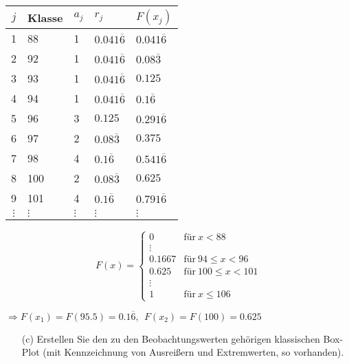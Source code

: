 
\begin{table}[H]
\centering
\begin{tabular}{c|llll}
     $j$      & Klasse   & $a_j$     & $r_j$               & $F(x_j)$ \\ \hline
     1        & 88       & 1         & $0.041\overline{6}$ & $0.041\overline{6}$ \\
     2        & 92       & 1         & $0.041\overline{6}$ & $0.08\overline{3}$  \\
     3        & 93       & 1         & $0.041\overline{6}$ & $0.125$             \\
     4        & 94       & 1         & $0.041\overline{6}$ & $0.1\overline{6}$   \\
     5        & 96       & 3         & $0.125$             & $0.291\overline{6}$ \\
     6        & 97       & 2         & $0.08\overline{3}$  & $0.375$             \\
     7        & 98       & 4         & $0.1\overline{6}$   & $0.541\overline{6}$ \\
     8        & 100      & 2         & $0.08\overline{3}$  & $0.625$             \\
     9        & 101      & 4         & $0.1\overline{6}$   & $0.791\overline{6}$ \\
     $\vdots$ & $\vdots$ & $\vdots$  & $\vdots$            & $\vdots$
\end{tabular}
\end{table}

$$
F(x) = \begin{cases}
    0      & \text{für}~x<88 \\
    \vdots & \\
    0.1667 & \text{für}~94\le x<96 \\
    0.625  & \text{für}~100\le x<101 \\
    \vdots & \\
    1      & \text{für}~x\le 106
\end{cases}
$$

$\Rightarrow F(x_1) = F(95.5) = 0.1\overline{6},~~F(x_2) = F(100) = 0.625$


\begin{task}
    \begin{enumerate}
        \item[(c)] Erstellen Sie den zu den Beobachtungswerten gehörigen klassischen Box-Plot (mit Kennzeichnung von Ausreißern und Extremwerten, so vorhanden).
    \end{enumerate}
\end{task}
